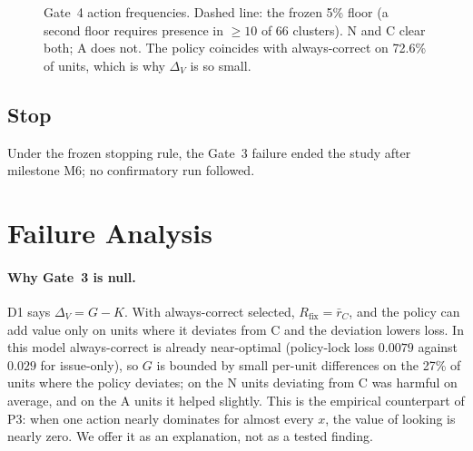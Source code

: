 \documentclass[10pt,twocolumn]{article}
\theoremstyle{definition}
\theoremstyle{remark}
\newcommand{\DV}{\Delta_V}
\begin{document}
\begin{figure}[t]
\centering
{}
\caption{Gate~4 action frequencies. Dashed line: the frozen 5\% floor (a second floor requires presence in $\ge10$ of 66 clusters). N and C clear both; A does not. The policy coincides with always-correct on 72.6\% of units, which is why $\DV$ is so small.}
\label{fig:gate4}
\end{figure}

\subsection{Stop}
Under the frozen stopping rule, the Gate~3 failure ended the study after milestone M6; no confirmatory run followed.

\section{Failure Analysis}\label{sec:failure}

\paragraph{Why Gate~3 is null.} D1 says $\DV=G-K$. With always-correct selected, $R_{\mathrm{fix}}=\bar r_C$, and the policy can add value only on units where it deviates from C and the deviation lowers loss. In this model always-correct is already near-optimal (policy-lock loss $0.0079$ against $0.029$ for issue-only), so $G$ is bounded by small per-unit differences on the 27\% of units where the policy deviates; on the N units deviating from C was harmful on average, and on the A units it helped slightly. This is the empirical counterpart of P3: when one action nearly dominates for almost every $x$, the value of looking is nearly zero. We offer it as an explanation, not as a tested finding.
\end{document}
